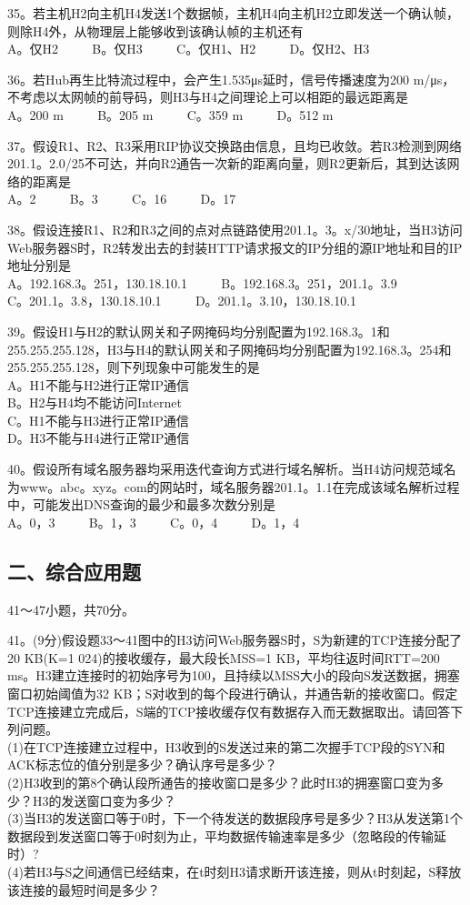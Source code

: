 35。若主机H2向主机H4发送1个数据帧，主机H4向主机H2立即发送一个确认帧，则除H4外，从物理层上能够收到该确认帧的主机还有 \\
A。仅H2 $\qquad$ B。仅H3 $\qquad$ C。仅H1、H2 $\qquad$ D。仅H2、H3

36。若Hub再生比特流过程中，会产生1.535μs延时，信号传播速度为200 m/μs，不考虑以太网帧的前导码，则H3与H4之间理论上可以相距的最远距离是 \\
A。200 m $\qquad$ B。205 m $\qquad$ C。359 m $\qquad$ D。512 m

37。假设R1、R2、R3采用RIP协议交换路由信息，且均已收敛。若R3检测到网络201.1。2.0/25不可达，并向R2通告一次新的距离向量，则R2更新后，其到达该网络的距离是 \\
A。2 $\qquad$ B。3 $\qquad$ C。16 $\qquad$ D。17

38。假设连接R1、R2和R3之间的点对点链路使用201.1。3。x/30地址，当H3访问Web服务器S时，R2转发出去的封装HTTP请求报文的IP分组的源IP地址和目的IP地址分别是 \\
A。192.168.3。251，130.18.10.1 $\qquad$ B。192.168.3。251，201.1。3.9 \\
C。201.1。3.8，130.18.10.1 $\qquad$ D。201.1。3.10，130.18.10.1

39。假设H1与H2的默认网关和子网掩码均分别配置为192.168.3。1和255.255.255.128，H3与H4的默认网关和子网掩码均分别配置为192.168.3。254和255.255.255.128，则下列现象中可能发生的是 \\
A。H1不能与H2进行正常IP通信 \\
B。H2与H4均不能访问Internet \\
C。H1不能与H3进行正常IP通信 \\
D。H3不能与H4进行正常IP通信

40。假设所有域名服务器均采用迭代查询方式进行域名解析。当H4访问规范域名为www。abc。xyz。com的网站时，域名服务器201.1。1.1在完成该域名解析过程中，可能发出DNS查询的最少和最多次数分别是 \\
A。0，3 $\qquad$ B。1，3 $\qquad$ C。0，4 $\qquad$ D。1，4

\subsection{二、综合应用题}

41～47小题，共70分。

41。(9分)假设题33～41图中的H3访问Web服务器S时，S为新建的TCP连接分配了20 KB(K=1 024)的接收缓存，最大段长MSS=1 KB，平均往返时间RTT=200 ms。H3建立连接时的初始序号为100，且持续以MSS大小的段向S发送数据，拥塞窗口初始阈值为32 KB；S对收到的每个段进行确认，并通告新的接收窗口。假定TCP连接建立完成后，S端的TCP接收缓存仅有数据存入而无数据取出。请回答下列问题。 \\
(1)在TCP连接建立过程中，H3收到的S发送过来的第二次握手TCP段的SYN和ACK标志位的值分别是多少？确认序号是多少？ \\
(2)H3收到的第8个确认段所通告的接收窗口是多少？此时H3的拥塞窗口变为多少？H3的发送窗口变为多少？ \\
(3)当H3的发送窗口等于0时，下一个待发送的数据段序号是多少？H3从发送第1个数据段到发送窗口等于0时刻为止，平均数据传输速率是多少（忽略段的传输延时）? \\
(4)若H3与S之间通信已经结束，在t时刻H3请求断开该连接，则从t时刻起，S释放该连接的最短时间是多少？

